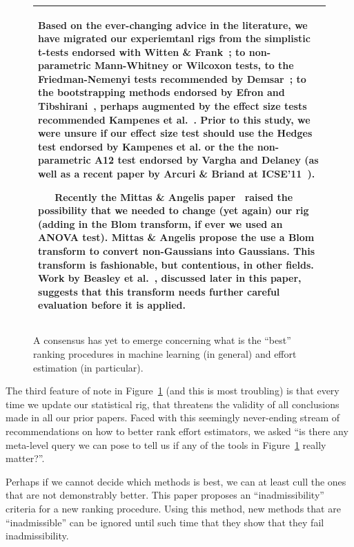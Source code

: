 \documentclass{sig-alternate}
\newcommand{\fig}[1]{Figure~\ref{fig:#1}}
\begin{document}
\begin{figure}[!b]
\begin{tabular}{|p{.95\linewidth}|}\hline
Based on the ever-changing
advice in the literature,
we have migrated our experiemtanl
rigs from the simplistic t-tests endorsed with
Witten \& Frank~\cite{Witten05}; 
to non-parametric Mann-Whitney or Wilcoxon tests, to the
Friedman-Nemenyi tests recommended by
Demsar~\cite{demsar06}; to the bootstrapping methods
endorsed by Efron and Tibshirani~\cite{efron93},
perhaps augmented by the effect size tests
recommended Kampenes et al.~\cite{kampenes07}.
Prior to this study, we were unsure if our effect
size test should use the Hedges test endorsed by
Kampenes et al. or the the non-parametric A12 test
endorsed by Vargha and
Delaney\cite{vargha2000critique} (as well as a
recent paper by Arcuri \& Briand at
ICSE'11~\cite{arcuri11}).  

~~~Recently the Mittas \&
Angelis paper~\cite{mittas12a} raised the
possibility that we needed to change (yet again)
our rig (adding in the  Blom transform, if
ever we used an ANOVA test).
Mittas \& Angelis propose the use a Blom transform
to convert non-Gaussians into Gaussians.
This transform is fashionable, but contentious, in other fields.
Work by Beasley et al.~\cite{beasley09}, discussed later
in this paper, suggests that this transform
needs further careful evaluation before it is applied.  
\\\hline
\end{tabular}
\caption{A consensus has yet to emerge concerning what is the
 ``best'' ranking procedures in machine learning (in general)
and effort estimation (in particular).}\label{fig:other}
\end{figure}

The third feature of note in \fig{other} (and this is most troubling)
is that  every time we update our statistical rig, that  threatens the validity
of all conclusions  made in all our prior papers.
Faced with this seemingly never-ending stream of 
recommendations on how to better rank effort estimators,
we asked ``is there any meta-level
query we can pose to tell us if any of the tools
in \fig{other} really matter?''. 

Perhaps if we cannot decide
which methods is best, we can at least cull the ones that are not
demonstrably better.
This paper proposes an ``inadmissibility'' criteria for a new
ranking procedure.  Using this method, new methods that are
``inadmissible'' can be ignored until such time that they
show that they fail inadmissibility.
\end{document}
